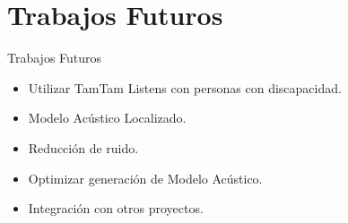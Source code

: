\section{Trabajos Futuros}

\begin{frame}{Trabajos Futuros}

\begin{itemize}
    \item Utilizar TamTam Listens con personas con discapacidad.
    \item Modelo Ac\'ustico Localizado.
    \item Reducci\'on de ruido.
    \item Optimizar generaci\'on de Modelo Ac\'ustico.
    \item Integraci\'on con otros proyectos.
\end{itemize}

\end{frame}
